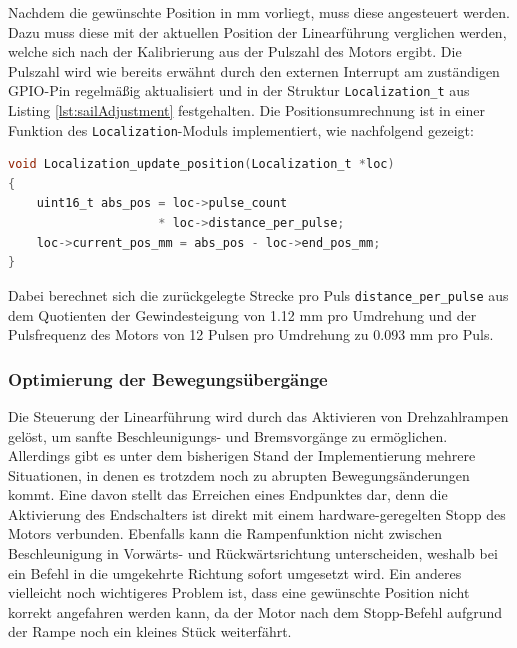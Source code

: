 \noindent
Nachdem die gewünschte Position in mm vorliegt, muss diese angesteuert werden. Dazu muss diese mit der aktuellen Position der Linearführung verglichen werden, welche sich nach der Kalibrierung aus der Pulszahl des Motors ergibt. Die Pulszahl wird wie bereits erwähnt durch den externen Interrupt am zuständigen GPIO-Pin regelmäßig aktualisiert und in der Struktur \verb|Localization_t| aus Listing \ref{lst:sailAdjustment} festgehalten. Die Positionsumrechnung ist in einer Funktion des \verb|Localization|-Moduls implementiert, wie nachfolgend gezeigt:
\begin{lstlisting}[language=C, caption={Positionsberechnung aus dem Pulssignal des Motors}, label={lst:pulseToPos}]
void Localization_update_position(Localization_t *loc)
{
	uint16_t abs_pos = loc->pulse_count
	                 * loc->distance_per_pulse;
	loc->current_pos_mm = abs_pos - loc->end_pos_mm;
}
\end{lstlisting}
Dabei berechnet sich die zurückgelegte Strecke pro Puls \verb|distance_per_pulse| aus dem Quotienten der Gewindesteigung von 1.12 mm pro Umdrehung und der Pulsfrequenz des Motors von 12 Pulsen pro Umdrehung zu 0.093 mm pro Puls.
\subsubsection{Optimierung der Bewegungsübergänge}
Die Steuerung der Linearführung wird durch das Aktivieren von Drehzahlrampen gelöst, um sanfte Beschleunigungs- und Bremsvorgänge zu ermöglichen. Allerdings gibt es unter dem bisherigen Stand der Implementierung mehrere Situationen, in denen es trotzdem noch zu abrupten Bewegungsänderungen kommt. Eine davon stellt das Erreichen eines Endpunktes dar, denn die Aktivierung des Endschalters ist direkt mit einem hardware-geregelten Stopp des Motors verbunden. Ebenfalls kann die Rampenfunktion nicht zwischen Beschleunigung in Vorwärts- und Rückwärtsrichtung unterscheiden, weshalb bei ein Befehl in die umgekehrte Richtung sofort umgesetzt wird. Ein anderes vielleicht noch wichtigeres Problem ist, dass eine gewünschte Position nicht korrekt angefahren werden kann, da der Motor nach dem Stopp-Befehl aufgrund der Rampe noch ein kleines Stück weiterfährt.\\

